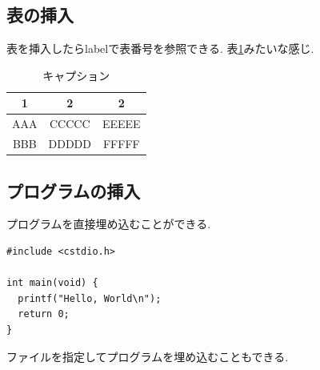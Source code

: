 \documentclass[a4paper]{jarticle}
\begin{document}
\subsection{表の挿入}

表を挿入したらlabelで表番号を参照できる.
表\ref{table1}みたいな感じ.

\begin{table}[htb]
  \begin{center}
    \caption{キャプション}
    \label{table1}
    \begin{tabular}{c|c|c}
      \hline
      1 & 2 & 2 \\
      \hline \hline
      AAA & CCCCC & EEEEE \\
      BBB & DDDDD & FFFFF \\
      \hline
    \end{tabular}
  \end{center}
\end{table}

\subsection{プログラムの挿入}

プログラムを直接埋め込むことができる.

\begin{lstlisting}
#include <cstdio.h>

int main(void) {
  printf("Hello, World\n");
  return 0;
}
\end{lstlisting}

ファイルを指定してプログラムを埋め込むこともできる.


\end{document}
